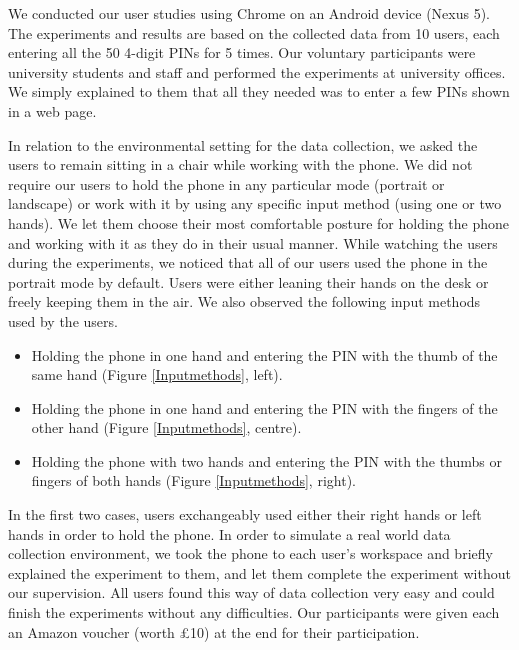 \documentclass[10pt,twocolumn]{article}
\begin{document}
We conducted our user studies using Chrome on an Android device (Nexus 5). The experiments and results are based on the collected data from 10 users, each entering all the 50 4-digit PINs for 5 times. 
Our voluntary participants were university students and staff and performed the experiments at university offices. We simply explained to them that all they needed was to enter a few PINs shown in a web page. 

In relation to the environmental setting for the data collection, 
we asked the users to remain sitting in a chair while working with the phone. We did not require our users to hold the phone in any particular mode (portrait or landscape) or work with it by using any specific input method (using one or two hands). 
We let them choose their most comfortable posture for holding the phone and working with it as they do in their usual manner. While watching the users during the experiments, we noticed that all of our users used the phone in the portrait mode by default. Users were either leaning their hands on the desk or freely keeping them in the air. We also observed the following input methods used by the users. 
\begin{itemize}
\item Holding the phone in one hand and entering the PIN with the thumb of the same hand (Figure \ref{Inputmethods}, left).
\item Holding the phone in one hand and entering the PIN with the fingers of the other hand (Figure \ref{Inputmethods}, centre). 
\item Holding the phone with two hands and entering the PIN with the thumbs or fingers of both hands (Figure \ref{Inputmethods}, right).
\end{itemize}  

In the first two cases, users exchangeably used either their right hands or left hands in order to hold the phone. In order to simulate a real world data collection environment, we took the phone to each user's workspace and briefly explained the experiment to them, and let them complete the experiment without our supervision. All users found this way of data collection very easy and could finish the experiments without any difficulties. Our participants were given each an Amazon voucher (worth \pounds 10) at the end for their participation.
\end{document}
